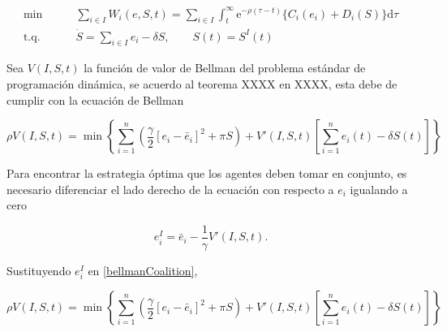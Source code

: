 \documentclass[11pt, oneside]{article}
\newcommand{\eu}{\ensuremath{\mathrm{e}}}
\newcommand{\du}{\ensuremath{\mathrm{d}}}
\begin{document}
\begin{align}
	\min &\qquad \sum_{i\in I} W_i(e,S,t) = \sum_{i\in I} \int_t^\infty \eu^{-\rho(\tau - t)}
	\{
		C_i(e_i) + D_i(S)
	\} \du \tau \\
	\mbox{t.q. } &\qquad \dot{S}  = \sum_{i \in I} e_i - \delta S, \qquad S(t) = S^I(t)
\end{align}

Sea $V(I,S, t)$ la función de valor de Bellman del problema estándar de programación dinámica, se acuerdo al teorema XXXX en XXXX, esta debe de cumplir con la ecuación de Bellman

\begin{equation}\label{bellmanCoalition}
	\rho V(I,S,t) = \min \left\{
		\sum_{i=1}^n \left(
		\frac{\gamma}{2}[e_i - \bar{e}_i]^2 + \pi S
		\right) + V'(I,S,t) \left[
			\sum_{i=1}^n e_i(t) - \delta S(t)
		\right]
	\right\}
\end{equation}

Para encontrar la estrategia óptima que los agentes deben tomar en conjunto, es necesario diferenciar el lado derecho de la ecuación con respecto a $e_i$ igualando a cero

\begin{equation}
	e_i^I = \bar{e}_i - \frac{1}{\gamma} V'(I,S,t).
\end{equation}

Sustituyendo $e_i^I$ en \eqref{bellmanCoalition},

\begin{equation}\label{bellmanCoalition}
	\rho V(I,S,t) = \min \left\{
		\sum_{i=1}^n \left(
		\frac{\gamma}{2}[e_i - \bar{e}_i]^2 + \pi S
		\right) + V'(I,S,t) \left[
			\sum_{i=1}^n e_i(t) - \delta S(t)
		\right]
	\right\}
\end{equation}




\end{document}
